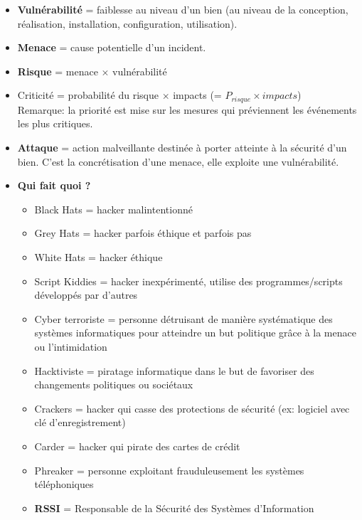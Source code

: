 \documentclass[a4paper]{article}
\begin{document}
\begin{itemize}
\item \textbf{Vulnérabilité} = faiblesse au niveau d’un bien (au niveau de la conception, réalisation, installation, configuration, utilisation).





\item \textbf{Menace} = cause potentielle d’un incident.





\item \textbf{Risque} = menace $ \times $ vulnérabilité





\item Criticité = probabilité du risque $ \times $ impacts (= $ P_{risque} \times impacts $) \\
Remarque: la priorité est mise sur les mesures qui préviennent les événements les plus critiques.





\item \textbf{Attaque} = action malveillante destinée à porter atteinte à la sécurité d’un bien. C'est la concrétisation d’une menace, elle exploite une vulnérabilité.





\item \textbf{Qui fait quoi ?}
\begin{itemize}
    \item Black Hats = hacker malintentionné
    \item Grey Hats = hacker parfois éthique et parfois pas
    \item White Hats = hacker éthique
    \item Script Kiddies = hacker inexpérimenté, utilise des programmes/scripts développés par d'autres
    \item Cyber terroriste = personne détruisant de manière systématique des systèmes informatiques pour atteindre un but politique grâce à la menace ou l'intimidation
    \item Hacktiviste = piratage informatique dans le but de favoriser des changements politiques ou sociétaux
    \item Crackers = hacker qui casse des protections de sécurité (ex: logiciel avec clé d'enregistrement)
    \item Carder = hacker qui pirate des cartes de crédit
    \item Phreaker = personne exploitant frauduleusement les systèmes téléphoniques
    \item \textbf{RSSI} = Responsable de la Sécurité des Systèmes d'Information
\end{itemize}






\end{itemize}
\end{document}
